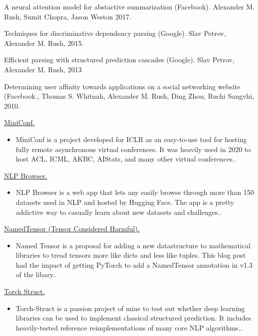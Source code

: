 \documentclass[10pt]{article}
\begin{document}
 \bigskip
{}

\ind A neural attention model for abstactive summarization (Facebook). Alexander M. Rush, Sumit Chopra, Jason Weston 2017.
\medskip

\ind Techniques for discriminative dependency parsing (Google). Slav Petrov, Alexander M. Rush, 2015.
\medskip

\ind Efficient parsing with structured prediction cascades (Google). Slav Petrov, Alexander M. Rush, 2013
\medskip

\ind  Determining user affinity towards applications on a social networking website (Facebook., Thomas S. Whitnah, Alexander M. Rush, Ding Zhou, Ruchi Sangvhi, 2010.



\bigskip


\bigskip

\ind \href{ paper.link } { MiniConf. }
\begin{itemize}
\item MiniConf is a project developed for ICLR as an easy-to-use tool for hosting fully remote asynchronous virtual conferences. It was heavily used in 2020 to host ACL, ICML, AKBC, AIStats, and many other virtual conferences..
\end{itemize}
\medskip


\ind \href{ paper.link } { NLP Browser. }
\begin{itemize}
\item NLP Browser is a web app that lets any easily browse through more than 150 datasets used in NLP and hosted by Hugging Face. The app is a pretty addictive way to casually learn about new datasets and challenges..
\end{itemize}
\medskip


\ind \href{ paper.link } { NamedTensor (Tensor Considered Harmful). }
\begin{itemize}
\item Named Tensor is a proposal for adding a new datastructure to mathematical libraries to tread tensors more like dicts and less like tuples. This blog post had the impact of getting PyTorch to add a NamedTensor annotation in v1.3 of the libary..
\end{itemize}
\medskip


\ind \href{ paper.link } { Torch Struct. }
\begin{itemize}
\item Torch-Struct is a passion project of mine to test out whether deep learning libraries can be used to implement classical structured prediction. It includes heavily-tested reference reimplementations of many core NLP algorithms..
\end{itemize}
\medskip
\end{document}
